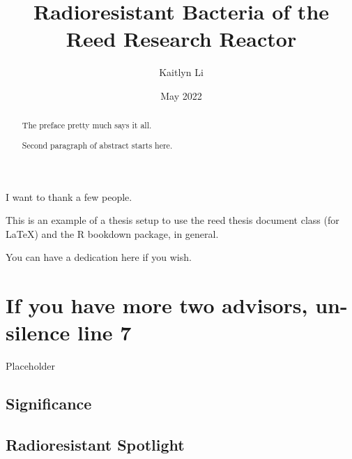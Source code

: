 \documentclass[12pt,twoside]{reedthesis}
\title{Radioresistant Bacteria of the Reed Research Reactor}
\author{Kaitlyn Li}
\date{May 2022}
\begin{document}
  \maketitle

\frontmatter %
\pagestyle{empty} %
  \begin{acknowledgements}
    I want to thank a few people.
  \end{acknowledgements}
  \begin{preface}
    This is an example of a thesis setup to use the reed thesis document class
    (for LaTeX) and the R bookdown package, in general.
  \end{preface}
  \hypersetup{linkcolor=black}
  \setcounter{secnumdepth}{2}
  \setcounter{tocdepth}{2}
  \tableofcontents

  \listoftables

  \listoffigures
  \begin{abstract}
    The preface pretty much says it all.
    
    \par
    
    Second paragraph of abstract starts here.
  \end{abstract}
  \begin{dedication}
    You can have a dedication here if you wish.
  \end{dedication}
\mainmatter %
\pagestyle{fancyplain} %

\hypertarget{if-you-have-more-two-advisors-un-silence-line-7}{%
\chapter{If you have more two advisors, un-silence line 7}\label{if-you-have-more-two-advisors-un-silence-line-7}}

Placeholder

\hypertarget{significance}{%
\section{Significance}\label{significance}}

\hypertarget{radioresistant-spotlight}{%
\section{Radioresistant Spotlight}\label{radioresistant-spotlight}}
\end{document}
